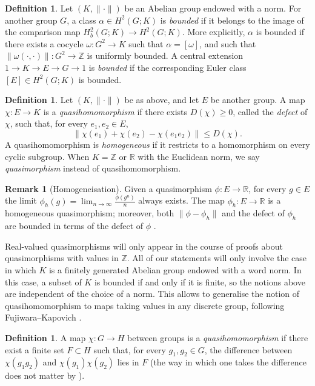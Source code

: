 \documentclass[svgnames]{amsart}
\theoremstyle{plain}
\theoremstyle{definition}
\newtheorem{defn}[thm]{Definition}
\newtheorem{rem}[thm]{Remark}
\newcommand{\Z}{\mathbb{Z}}
\newcommand{\R}{\mathbb{R}}
\begin{document}
\begin{defn}
\label{def:bddce}
    Let $(K, \| \cdot \|)$ be an Abelian group endowed with a norm. For another group $G$, a class $\alpha \in H^2(G; K)$ is \emph{bounded} if it belongs to the image of the comparison map $H^2_b(G; K) \to H^2(G; K)$. More explicitly, $\alpha$ is bounded if there exists a cocycle $\omega : G^2 \to K$ such that $\alpha = [\omega]$, and such that $\|\omega(\cdot,\cdot)\|\colon G^2\to \Z$ is uniformly bounded.
    A central extension $1 \to K \to E \to G \to 1$ is \emph{bounded} if the corresponding Euler class $[E] \in H^2(G; K)$ is bounded.
\end{defn}

\begin{defn}
\label{def:qm}
    Let $(K, \| \cdot \|)$ be as above, and let $E$ be another group. A map $\chi\colon E\to K$ is a \emph{quasihomomorphism} if there exists $D(\chi)\ge 0$, called the \emph{defect} of $\chi$, such that, for every $e_1,e_2 \in E$, 
    $$\|\chi(e_1)+\chi(e_2)-\chi(e_1e_2)\|\le D(\chi).$$
    A quasihomomorphism is \emph{homogeneous} if it restricts to a homomorphism on every cyclic subgroup. When $K=\Z$ or $\R$ with the Euclidean norm, we say \emph{quasimorphism} instead of quasihomomorphism.
\end{defn}

\begin{rem}[Homogeneisation]\label{ref:plasmon}
    Given a quasimorphism $\phi\colon E\to \R$, for every $g\in E$ the limit $\phi_h(g)=\lim_{n\to \infty}\frac{\phi(g^n)}{n}$ always exists. The map $\phi_h\colon E\to \R$ is a homogeneous quasimorphism; moreover, both $\|\phi-\phi_h\|$ and the defect of $\phi_h$ are bounded in terms of the defect of $\phi$ \cite[Lemma 2.21]{calegari}.
\end{rem}

Real-valued quasimorphisms will only appear in the course of proofs about quasimorphisms with values in $\Z$. All of our statements will only involve the case in which $K$ is a finitely generated Abelian group endowed with a word norm. In this case, a subset of $K$ is bounded if and only if it is finite, so the notions above are independent of the choice of a norm. This allows to generalise the notion of quasihomomorphism to maps taking values in any discrete group, following Fujiwara--Kapovich \cite{fujikapo}.

\begin{defn}
\label{defn:qhm:noncommutative}
    A map $\chi\colon G\to H$ between groups is a \emph{quasihomomorphism} if there exist a finite set $F\subset H$ such that, for every $g_1,g_2\in G$, the difference between $\chi(g_1g_2)$ and $\chi(g_1)\chi(g_2)$ lies in $F$ (the way in which one takes the difference does not matter by \cite[Proposition 2.3]{heuer}).
\end{defn}
\end{document}
